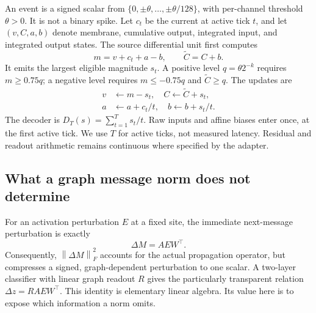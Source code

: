\documentclass[10pt,twocolumn,letterpaper]{article}
\newcommand{\norm}[1]{\left\lVert#1\right\rVert}
\begin{document}
An event is a signed scalar from $\{0,\pm\theta,\ldots,\pm\theta/128\}$, with per-channel threshold $\theta>0$. It is not a binary spike. Let $c_t$ be the current at active tick $t$, and let $(v,C,a,b)$ denote membrane, cumulative output, integrated input, and integrated output states. The source differential unit first computes
\begin{equation}
 m=v+c_t+a-b,\qquad \widetilde C=C+b.
\end{equation}
It emits the largest eligible magnitude $s_t$. A positive level $q=\theta2^{-k}$ requires $m\geq0.75q$; a negative level requires $m\leq-0.75q$ and $\widetilde C\geq q$. The updates are
\begin{equation}
\begin{split}
 v&\leftarrow m-s_t,\quad C\leftarrow\widetilde C+s_t,\\
 a&\leftarrow a+c_t/t,\quad b\leftarrow b+s_t/t.
\end{split}\label{eq:state}
\end{equation}
The decoder is $D_T(s)=\sum_{t=1}^T s_t/t$. Raw inputs and affine biases enter once, at the first active tick. We use $T$ for active ticks, not measured latency. Residual and readout arithmetic remains continuous where specified by the adapter.

\subsection{What a graph message norm does not determine}
For an activation perturbation $E$ at a fixed site, the immediate next-message perturbation is exactly
\begin{equation}
 \Delta M=AEW^\top.\label{eq:message}
\end{equation}
Consequently, $\norm{\Delta M}_F^2$ accounts for the actual propagation operator, but compresses a signed, graph-dependent perturbation to one scalar. A two-layer classifier with linear graph readout $R$ gives the particularly transparent relation $\Delta z=RAEW^\top$. This identity is elementary linear algebra. Its value here is to expose which information a norm omits.
\end{document}
